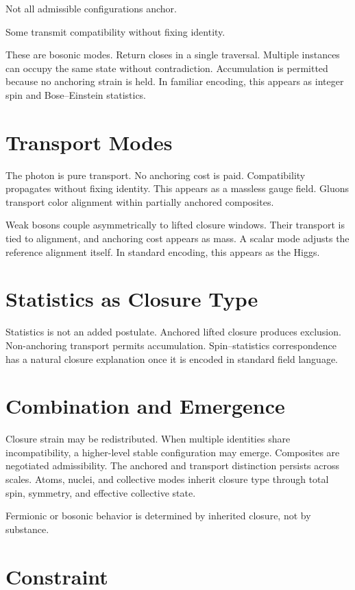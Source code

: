 \documentclass[11pt,twoside,openright]{book}
\begin{document}
Not all admissible configurations anchor.

Some transmit compatibility without fixing identity.

These are bosonic modes. Return closes in a single traversal. Multiple instances can occupy the same state without contradiction. Accumulation is permitted because no anchoring strain is held. In familiar encoding, this appears as integer spin and Bose--Einstein statistics.

\section*{Transport Modes}

The photon is pure transport. No anchoring cost is paid. Compatibility propagates without fixing identity. This appears as a massless gauge field. Gluons transport color alignment within partially anchored composites.

Weak bosons couple asymmetrically to lifted closure windows. Their transport is tied to alignment, and anchoring cost appears as mass. A scalar mode adjusts the reference alignment itself. In standard encoding, this appears as the Higgs.

\section*{Statistics as Closure Type}

Statistics is not an added postulate. Anchored lifted closure produces exclusion. Non-anchoring transport permits accumulation. Spin--statistics correspondence has a natural closure explanation once it is encoded in standard field language.

\section*{Combination and Emergence}

Closure strain may be redistributed. When multiple identities share incompatibility, a higher-level stable configuration may emerge. Composites are negotiated admissibility. The anchored and transport distinction persists across scales. Atoms, nuclei, and collective modes inherit closure type through total spin, symmetry, and effective collective state.

Fermionic or bosonic behavior is determined by inherited closure, not by substance.

\section*{Constraint}
\end{document}
